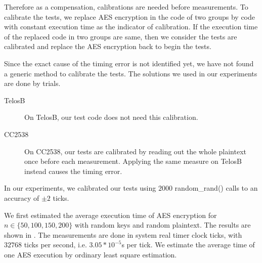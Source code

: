 Therefore as a compensation, calibrations are needed before measurements. To calibrate the tests, we replace AES encryption in the code of two groups by code with constant execution time as the indicator of calibration. If the execution time of the replaced code in two groups are same, then we consider the tests are calibrated and replace the AES encryption back to begin the tests.

Since the exact cause of the timing error is not identified yet, we have not found a generic method to calibrate the tests. The solutions we used in our experiments are done by trials.

\begin{description}
	\item[TelosB] On TelosB, our test code does not need this calibration.
	\item[CC2538] On CC2538, our tests are calibrated by reading out the whole plaintext once before each measurement. Applying the same measure on TelosB instead causes the timing error.
\end{description}

In our experiments, we calibrated our tests using $2000$ random\_rand() calls to an accuracy of $\pm{2}$ ticks.

We first estimated the average execution time of AES encryption for $n \in \{ 50, 100, 150, 200\}$ with random keys and random plaintext. The results are shown in . The measurements are done in system real timer clock ticks, with $32768$ ticks per second, i.e. $3.05 * 10^{-5}$s per tick. We estimate the average time of one AES execution by ordinary least square estimation.

